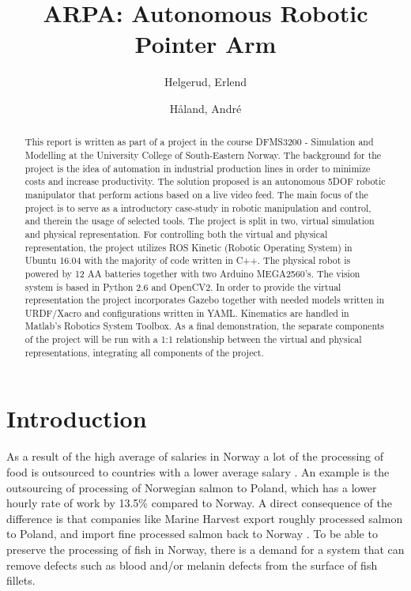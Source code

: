 \documentclass[11pt,a4paper, titlepage]{article}
\title{ARPA: Autonomous Robotic Pointer Arm}
\author{Helgerud, Erlend \and Håland, André}
\begin{document}
	\setlength\parindent{0pt}
	\setlength\parskip{10pt}
	\headheight
	\setlength{15pt}{}
	\footskip
	\setlength{33pt}{}
	\setcounter{secnumdepth}{4}
	\maketitle
	
\begin{abstract}
This report is written as part of a project in the course DFMS3200 - Simulation and Modelling at the University College of South-Eastern Norway. The background for the project is the idea of automation in industrial production lines in order to minimize costs and increase productivity. The solution proposed is an autonomous 5DOF robotic manipulator that perform actions based on a live video feed. The main focus of the project is to serve as a introductory case-study in robotic manipulation and control, and therein the usage of selected tools. The project is split in two, virtual simulation and physical representation. For controlling both the virtual and physical representation, the project utilizes ROS Kinetic (Robotic Operating System) in Ubuntu 16.04 with the majority of code written in C++. The physical robot is powered by 12 AA batteries together with two Arduino MEGA2560's. The vision system is based in Python 2.6 and OpenCV2. In order to provide the virtual representation the project incorporates Gazebo together with needed models written in URDF/Xacro and configurations written in YAML. Kinematics are handled in Matlab's Robotics System Toolbox. As a final demonstration, the separate components of the project will be run with a 1:1 relationship between the virtual and physical representations, integrating all components of the project.
\end{abstract}
	
	\tableofcontents
	\newpage
	\listoffigures
	\newpage
	\listoftables
	\newpage
{}
\section{Introduction}
As a result of the high average of salaries in Norway a lot of the processing of food is outsourced to countries with a lower average salary \cite{berge2015}. An example is the outsourcing of processing of Norwegian salmon to Poland, which has a lower hourly rate of work by 13.5\% compared to Norway. A direct consequence of the difference is that companies like Marine Harvest export roughly processed salmon to Poland, and import fine processed salmon back to Norway \cite{digre2014}. To be able to preserve the processing of fish in Norway, there is a demand for a system that can remove defects such as blood and/or melanin defects from the surface of fish fillets.
\end{document}
